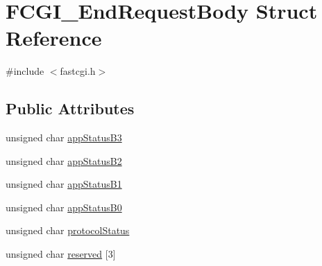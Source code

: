 \hypertarget{structFCGI__EndRequestBody}{\section{F\-C\-G\-I\-\_\-\-End\-Request\-Body Struct Reference}
\label{structFCGI__EndRequestBody}
}


{\ttfamily \#include $<$fastcgi.\-h$>$}

\subsection*{Public Attributes}
\begin{DoxyCompactItemize}
\item 
unsigned char \hyperlink{structFCGI__EndRequestBody_a91ec9fe7e3113e4fa46bfe4adace3f53}{app\-Status\-B3}
\item 
unsigned char \hyperlink{structFCGI__EndRequestBody_a953e5f4a6aa806f227cd21d0899e0705}{app\-Status\-B2}
\item 
unsigned char \hyperlink{structFCGI__EndRequestBody_a99aade4e57e82b093002c404355ccce2}{app\-Status\-B1}
\item 
unsigned char \hyperlink{structFCGI__EndRequestBody_a76d1d72eef07cfb6a40de1c3a5798cc1}{app\-Status\-B0}
\item 
unsigned char \hyperlink{structFCGI__EndRequestBody_ae5d149d1d4755f0c0bc0867ba5de2cec}{protocol\-Status}
\item 
unsigned char \hyperlink{structFCGI__EndRequestBody_a599ca22f232d473e9c783075bd1fb905}{reserved} \mbox{[}3\mbox{]}
\end{DoxyCompactItemize}



